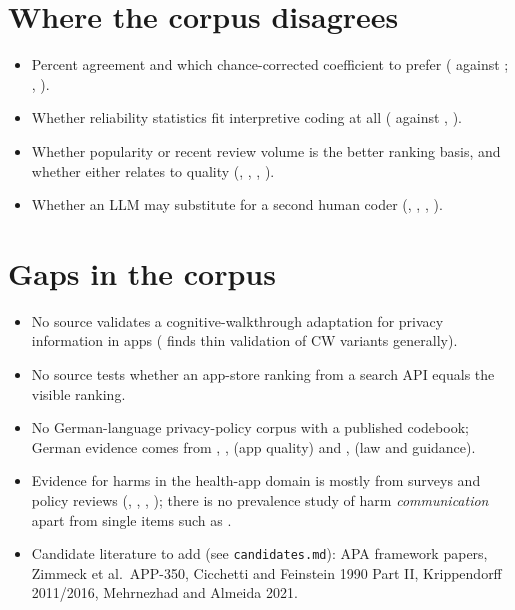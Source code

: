 \section{Where the corpus disagrees}
\begin{itemize}
\item Percent agreement and which chance-corrected coefficient to prefer ( against ; , ).
\item Whether reliability statistics fit interpretive coding at all ( against , ).
\item Whether popularity or recent review volume is the better ranking basis, and whether either relates to quality (, , , ).
\item Whether an LLM may substitute for a second human coder (, , , ).
\end{itemize}

\section{Gaps in the corpus}
\begin{itemize}
\item No source validates a cognitive-walkthrough adaptation for privacy information in apps ( finds thin validation of CW variants generally).
\item No source tests whether an app-store ranking from a search API equals the visible ranking.
\item No German-language privacy-policy corpus with a published codebook; German evidence comes from , ,  (app quality) and ,  (law and guidance).
\item Evidence for harms in the health-app domain is mostly from surveys and policy reviews (, , , ); there is no prevalence study of harm \emph{communication} apart from single items such as .
\item Candidate literature to add (see \texttt{candidates.md}): APA framework papers, Zimmeck et al.\ APP-350, Cicchetti and Feinstein 1990 Part II, Krippendorff 2011/2016, Mehrnezhad and Almeida 2021.
\end{itemize}
